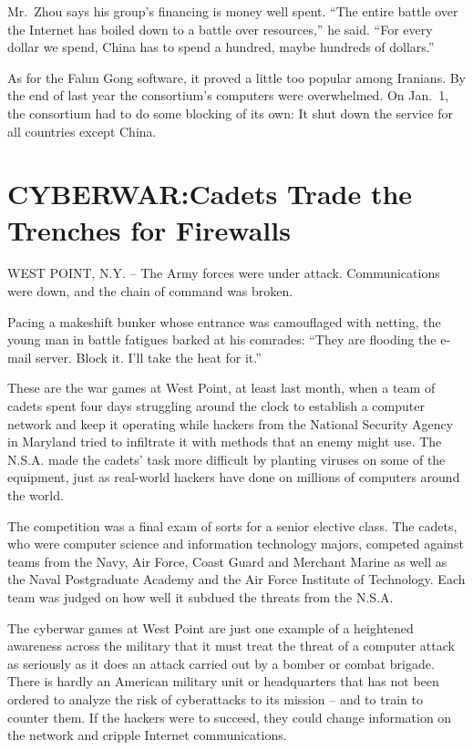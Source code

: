 \documentclass[12pt,a4paper,onecolumn]{article}
\begin{document}
Mr.~Zhou says his group's financing is money well spent. ``The entire battle over the Internet has
boiled down to a battle over resources,'' he said. ``For every dollar we spend, China has to spend a
hundred, maybe hundreds of dollars.''

As for the Falun Gong software, it proved a little too popular among Iranians. By the end of last
year the consortium's computers were overwhelmed. On Jan.~1, the consortium had to do some blocking
of its own: It shut down the service for all countries except China.

\section{CYBERWAR:Cadets Trade the Trenches for Firewalls}

WEST POINT, N.Y. -- The Army forces were under attack. Communications were down, and the chain of
command was broken.

Pacing a makeshift bunker whose entrance was camouflaged with netting, the young man in battle
fatigues barked at his comrades: ``They are flooding the e-mail server. Block it. I'll take the heat
for it.''

These are the war games at West Point, at least last month, when a team of cadets spent four days
struggling around the clock to establish a computer network and keep it operating while hackers from
the National Security Agency in Maryland tried to infiltrate it with methods that an enemy might
use. The N.S.A. made the cadets' task more difficult by planting viruses on some of the equipment,
just as real-world hackers have done on millions of computers around the world.

The competition was a final exam of sorts for a senior elective class. The cadets, who were computer
science and information technology majors, competed against teams from the Navy, Air Force, Coast
Guard and Merchant Marine as well as the Naval Postgraduate Academy and the Air Force Institute of
Technology. Each team was judged on how well it subdued the threats from the N.S.A.

The cyberwar games at West Point are just one example of a heightened awareness across the military
that it must treat the threat of a computer attack as seriously as it does an attack carried out by
a bomber or combat brigade. There is hardly an American military unit or headquarters that has not
been ordered to analyze the risk of cyberattacks to its mission -- and to train to counter them. If
the hackers were to succeed, they could change information on the network and cripple Internet
communications.
\end{document}
